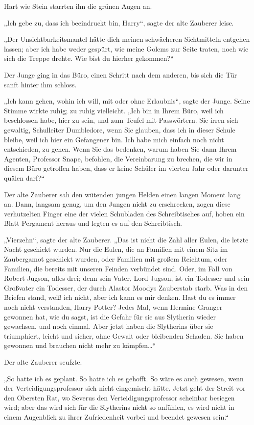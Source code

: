 {Hart wie Stein starrten ihn die grünen Augen an.

„Ich gebe zu, dass ich beeindruckt bin, Harry“, sagte der alte Zauberer leise.

„Der Unsichtbarkeitsmantel hätte dich meinen schwächeren Sichtmitteln entgehen lassen; aber ich habe weder gespürt, wie meine Golems zur Seite traten, noch wie sich die Treppe drehte. Wie bist du hierher gekommen?“

Der Junge ging in das Büro, einen Schritt nach dem anderen, bis sich die Tür sanft hinter ihm schloss.

„Ich kann gehen, wohin ich will, mit oder ohne Erlaubnis“, sagte der Junge. Seine Stimme wirkte ruhig; zu ruhig vielleicht. „Ich bin in Ihrem Büro, weil ich beschlossen habe, hier zu sein, und zum Teufel mit Passwörtern. Sie irren sich gewaltig, Schulleiter Dumbledore, wenn Sie glauben, dass ich in dieser Schule bleibe, weil ich hier ein Gefangener bin. Ich habe mich einfach noch nicht entschieden, zu gehen. Wenn Sie das bedenken, warum haben Sie dann Ihrem Agenten, Professor Snape, befohlen, die Vereinbarung zu brechen, die wir in diesem Büro getroffen haben, dass er keine Schüler im vierten Jahr oder darunter quälen darf?“

Der alte Zauberer sah den wütenden jungen Helden einen langen Moment lang an. Dann, langsam genug, um den Jungen nicht zu erschrecken, zogen diese verhutzelten Finger eine der vielen Schubladen des Schreibtisches auf, hoben ein Blatt Pergament heraus und legten es auf den Schreibtisch.

„Vierzehn“, sagte der alte Zauberer. „Das ist nicht die Zahl aller Eulen, die letzte Nacht geschickt wurden. Nur die Eulen, die an Familien mit einem Sitz im Zaubergamot geschickt wurden, oder Familien mit großem Reichtum, oder Familien, die bereits mit unseren Feinden verbündet sind. Oder, im Fall von Robert Jugson, alles drei; denn sein Vater, Lord Jugson, ist ein Todesser und sein Großvater ein Todesser, der durch Alastor Moodys Zauberstab starb. Was in den Briefen stand, weiß ich nicht, aber ich kann es mir denken. Hast du es immer noch nicht verstanden, Harry Potter? Jedes Mal, wenn Hermine Granger gewonnen hat, wie du sagst, ist die Gefahr für sie aus Slytherin wieder gewachsen, und noch einmal. Aber jetzt haben die Slytherins über sie triumphiert, leicht und sicher, ohne Gewalt oder bleibenden Schaden. Sie haben gewonnen und brauchen nicht mehr zu kämpfen…“

Der alte Zauberer seufzte.

„So hatte ich es geplant. So hatte ich es gehofft. So wäre es auch gewesen, wenn der Verteidigungsprofessor sich nicht eingemischt hätte. Jetzt geht der Streit vor den Obersten Rat, wo Severus den Verteidigungsprofessor scheinbar besiegen wird; aber das wird sich für die Slytherins nicht so anfühlen, es wird nicht in einem Augenblick zu ihrer Zufriedenheit vorbei und beendet gewesen sein.“

}
